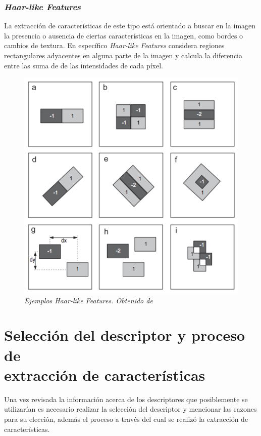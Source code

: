 \subsubsection{\textit{Haar-like Features}}

La extracción de características de este tipo está orientado a buscar en la imagen la presencia o ausencia de ciertas características en la imagen, como bordes o cambios de textura. En específico \textit{Haar-like Features} considera regiones rectangulares adyacentes en alguna parte de la imagen y calcula la diferencia entre las suma de de las intensidades de cada píxel.

\begin{figure}[hp]
  \centering
  \includegraphics[scale=.3]{images/haarlike}
  \caption{\em Ejemplos \textit{Haar-like Features}. Obtenido de \cite{Pavani2010} }  
  \label{fig:haar}
\end{figure}

\section{Selección del descriptor y proceso de \\extracción de características}
\label{caract:seleccion}

Una vez revisada la información acerca de los descriptores que posiblemente se utilizarían es necesario realizar la selección del descriptor y mencionar las razones para su elección, además el proceso a través del cual se realizó la extracción de características.

